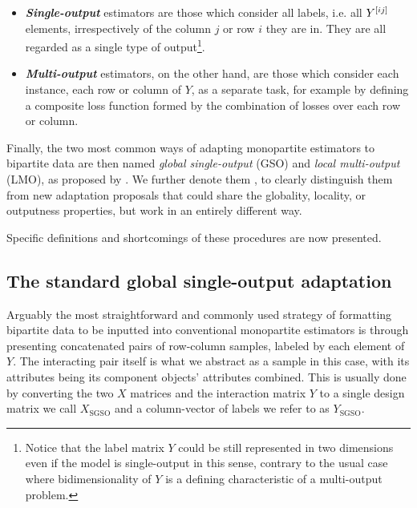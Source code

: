 \begin{itemize}
    \item \emph{\textbf{Single-output}} estimators are those which consider all labels, i.e. all $Y^{[ij]}$ elements, irrespectively of the column $j$ or row $i$ they are in. They are all regarded as a single type of output\footnote{Notice that the label matrix $Y$ could be still represented in two dimensions even if the model is single-output in this sense, contrary to the usual case where bidimensionality of $Y$ is a defining characteristic of a multi-output problem.}.
    \item \emph{\textbf{Multi-output}} estimators, on the other hand, are those which consider each instance, each row or column of $Y$, as a separate task, for example by defining a composite loss function formed by the combination of losses over each row or column.
\end{itemize}

Finally, the two most common ways of adapting monopartite estimators to bipartite data are then named \emph{global single-output} (GSO) and \emph{local multi-output} (LMO), as proposed by \citet{pliakos2018,pliakos2019,pliakos2020}. We further denote them , to clearly distinguish them from new adaptation proposals that could share the globality, locality, or outputness properties, but work in an entirely different way.

Specific definitions and shortcomings of these procedures are now presented.


\subsection{The standard global single-output adaptation}
\label{sec:sgso}
Arguably the most straightforward and commonly used strategy of formatting bipartite data to be inputted into conventional monopartite estimators is through presenting concatenated pairs of row-column samples, labeled by each element of $Y$.
%
The interacting pair itself is what we abstract as a sample
in this case, with its attributes being its component objects' attributes
combined. This is usually done by converting the two $X$ matrices and the
interaction matrix $Y$ to a single design matrix we call $X_\text{SGSO}$ and a column-vector
 of labels we refer to as $Y_\text{SGSO}$.

